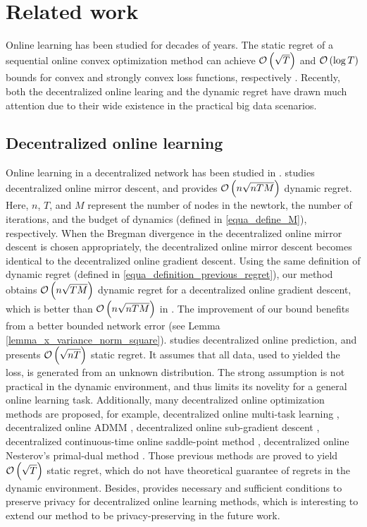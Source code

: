 \documentclass{article}
\begin{document}
{\color{blue}

\section{Related work}
\label{sect_related_work}
Online learning has been studied for decades of years. The static regret of a sequential online convex optimization method can achieve ${\mathcal{O}\left( \sqrt{T} \right)}$ and ${\mathcal{O}\left( \log T \right)}$ bounds for convex and strongly convex loss functions, respectively \citep{Hazan2016Introduction,ShalevShwartz:2012dz}. Recently, both the decentralized online learing and the dynamic regret have drawn much attention due to their wide existence in the practical big data scenarios.
\subsection{Decentralized online learning}
Online learning in a decentralized network has been studied in \citep{8015179Shahram,Kamp:2014:CDO,Koppel-8352032,Zhang2018,pmlr-v70-zhang17g,Xu2015,tcns-7353155,cdc-7798923,acc-7172037,tcns-7479495,Benczur:2018ww,tkde-6311406}.  \citet{8015179Shahram} studies decentralized online mirror descent, and provides ${\mathcal{O}\left( n\sqrt{nTM} \right)}$ dynamic regret. Here, $n$, $T$, and $M$ represent the number of nodes in the newtork, the number of iterations, and the budget of dynamics (defined in \eqref{equa_define_M}), respectively.  When the Bregman divergence in the decentralized online mirror descent is chosen appropriately, the decentralized online mirror descent becomes identical to the decentralized online gradient descent. Using the same definition of dynamic regret (defined in \eqref{equa_definition_previous_regret}), our method obtains ${\mathcal{O}\left( n\sqrt{TM} \right)}$ dynamic regret for a decentralized online gradient descent, which is better than ${\mathcal{O}\left( n\sqrt{nTM} \right)}$ in \citet{8015179Shahram}. The improvement of our bound benefits from a better bounded network error (see Lemma \ref{lemma_x_variance_norm_square}). \citet{Kamp:2014:CDO} studies decentralized online prediction, and presents ${\mathcal{O}\left( \sqrt{nT} \right)}$ static regret.  It assumes that all data, used to yielded the loss, is generated from an unknown distribution. The strong assumption is not practical in the dynamic environment, and thus limits its novelity for a general online learning task. 
Additionally, many decentralized online optimization methods are proposed, for example, decentralized online multi-task learning \citep{Zhang2018}, decentralized online ADMM \citep{Xu2015}, decentralized online sub-gradient descent \citep{tcns-7353155}, decentralized continuous-time online saddle-point method \citep{cdc-7798923}, decentralized online  Nesterov's primal-dual method \citep{acc-7172037,tcns-7479495}. Those previous methods are proved to yield ${\mathcal{O}\left( \sqrt{T} \right)}$ static regret, which do not have theoretical guarantee of regrets in the dynamic environment.   Besides,  \citet{tkde-6311406} provides necessary and sufficient conditions to preserve privacy for decentralized online learning methods, which is interesting to extend our method to be privacy-preserving in the future work.


}
\end{document}
